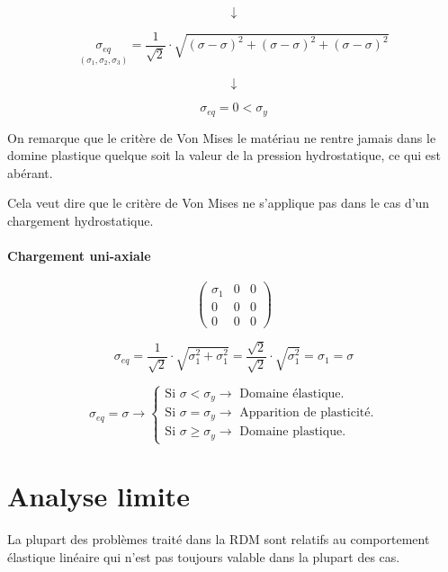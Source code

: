 \documentclass[12pt,a4paper]{report}
\renewcommand{\geq}{\geqslant}
\begin{document}
	\[ \downarrow \]
	
	\[ \underset{(\sigma_{1},\sigma_{2},\sigma_{3})}{\sigma_{eq}} = \dfrac{1}{\sqrt{2}} \cdot \sqrt{ (\sigma - \sigma)^{2} + (\sigma - \sigma)^{2} + (\sigma - \sigma)^{2} } \]
	
	\[ \downarrow \]
	
	\[ \sigma_{eq} = 0 < \sigma_{y} \]
	
	
	\begin{tcolorbox}[colback=gray!20, colframe=black, title=Remarque]
		On remarque que le critère de Von Mises le matériau ne rentre jamais dans le domine plastique quelque soit la valeur de la pression hydrostatique, ce qui est abérant.
		
		Cela veut dire que le critère de Von Mises ne s'applique pas dans le cas d'un chargement hydrostatique.
	\end{tcolorbox}
	
	\vspace{\baselineskip}
	
	\paragraph{Chargement uni-axiale}
	
	\[ \begin{pmatrix}
		\sigma_{1}&0&0\\
		0&0&0\\
		0&0&0
	\end{pmatrix} \]
	
	\[ \sigma_{eq} = \dfrac{1}{\sqrt{2}} \cdot \sqrt{\sigma_{1}^{2} + \sigma_{1}^{2}} = \dfrac{\sqrt{2}}{\sqrt{2}} \cdot \sqrt{\sigma_{1}^{2}} = \sigma_{1} = \sigma \]
	
	
	\[ \sigma_{eq} = \sigma \rightarrow \begin{cases}
		\text{Si $\sigma < \sigma_{y} \rightarrow$ Domaine élastique.} \\
		\text{Si $\sigma = \sigma_{y} \rightarrow$ Apparition de plasticité.} \\
		\text{Si $\sigma \geq \sigma_{y} \rightarrow$ Domaine plastique.}
	\end{cases} \]
	
	
	
	
	\section{Analyse limite}
	
	La plupart des problèmes traité dans la RDM sont relatifs au comportement élastique linéaire qui n'est pas toujours valable dans la plupart des cas.
	
\end{document}
